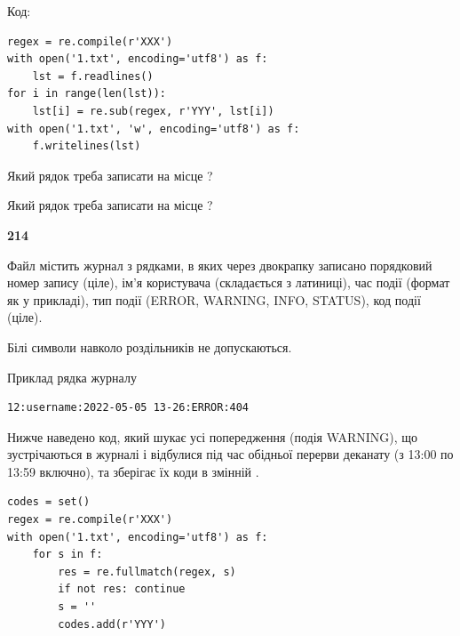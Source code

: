 Код:



\begin{verbatim}
regex = re.compile(r'XXX')
with open('1.txt', encoding='utf8') as f:
    lst = f.readlines()
for i in range(len(lst)):
    lst[i] = re.sub(regex, r'YYY', lst[i])
with open('1.txt', 'w', encoding='utf8') as f:
    f.writelines(lst)
\end{verbatim}









Який рядок треба записати на місце  ?\par
\vspace{5mm}


Який рядок треба записати на місце  ?\par


\newpage

{\begin {center}\textbf{ 214}\end {center}}\par
Файл  містить журнал з рядками, в яких через двокрапку записано поряд\-ко\-вий номер запису (ціле), ім'я користувача (складається з латиниці), час події (фор\-мат як у прикладі), тип події (ERROR, WARNING, INFO, STATUS), код події (ціле).

Білі символи навколо роздільників не допускаються.

Приклад рядка журналу



\begin{verbatim}
12:username:2022-05-05 13-26:ERROR:404
\end{verbatim}


Нижче наведено код, який шукає усі попередження (подія WARNING), що зустрі\-ча\-ються в журналі і відбулися під час обідньої перерви деканату (з 13:00 по 13:59 включно), та зберігає їх коди в змінній .



\begin{verbatim}
codes = set()
regex = re.compile(r'XXX')
with open('1.txt', encoding='utf8') as f:
    for s in f:
        res = re.fullmatch(regex, s)
        if not res: continue
        s = ''
        codes.add(r'YYY')
\end{verbatim}








